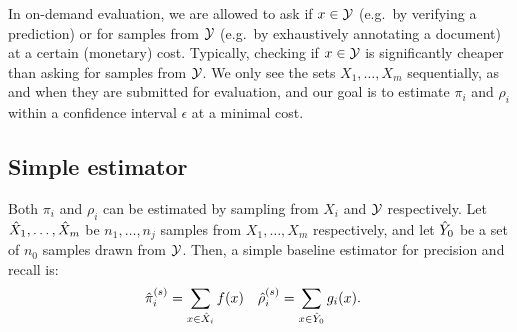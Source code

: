 In on-demand evaluation, we are allowed to ask if $x \in \mathcal{Y}$ (e.g.\, by verifying a prediction) or for samples from $\mathcal{Y}$ (e.g.\, by exhaustively annotating a document) at a certain (monetary) cost.
Typically, checking if $x \in \mathcal{Y}$ is significantly cheaper than asking for samples from $\mathcal{Y}$.
We only see the sets $X_1, \ldots, X_m$ sequentially, as and when they are submitted for evaluation, and
  our goal is to estimate $\pi_i$ and $\rho_i$ within a confidence interval $\epsilon$ at a minimal cost. 

\subsection{Simple estimator}
Both $\pi_i$ and $\rho_i$ can be estimated by sampling from $X_i$ and $\mathcal{Y}$ respectively.
Let ${\hat{X}}_1, \ldots, {\hat{X}}_m$ be $n_1, \ldots, n_j$ samples from $X_1, \ldots, X_m$ respectively, and let ${\hat{Y}}_0$ be a set of $n_0$ samples drawn from $\mathcal{Y}$.
Then, a simple baseline estimator for precision and recall is:
\begin{align}
  {\hat{\pi}}_i^{(s)} &= \sum_{x \in {\hat{X}}_i} f(x) & {\hat{\rho}}_i^{(s)} &= \sum_{x \in {\hat{Y}}_0} g_i(x).
\end{align}

